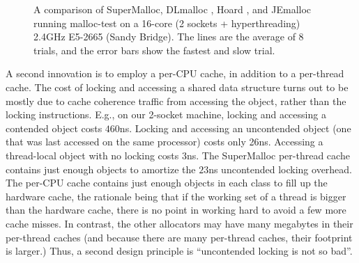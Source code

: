 \documentclass[pldi]{sigplanconf-pldi15}
\begin{document}
\begin{figure}

\caption{A comparison of SuperMalloc, DLmalloc \cite{Lea96}, Hoard
  \cite{BergerMcBl00}, and JEmalloc~\cite{Evans06} running malloc-test
  on a 16-core (2 sockets + hyperthreading) 2.4GHz E5-2665 (Sandy
  Bridge).  The lines are the average of 8 trials, and the error bars
  show the fastest and slow trial.}
\label{fig:data}
\vspace*{-3ex}
\end{figure}


A second innovation is to employ a per-CPU cache, in addition to a
per-thread cache.  The cost of locking and accessing a shared data
structure turns out to be mostly due to cache coherence traffic from
accessing the object, rather than the locking instructions.  E.g., on
our 2-socket machine, locking and accessing a contended object costs
$460$ns.  Locking and accessing an uncontended object (one that was
last accessed on the same processor) costs only 26ns.  Accessing a
thread-local object with no locking costs $3$ns.  The SuperMalloc
per-thread cache contains just enough objects to amortize the $23$ns
uncontended locking overhead.  The per-CPU cache contains just enough
objects in each class to fill up the hardware cache, the rationale
being that if the working set of a thread is bigger than the hardware
cache, there is no point in working hard to avoid a few more cache
misses.  In contrast, the other allocators may have many megabytes in
their per-thread caches (and because there are many per-thread caches,
their footprint is larger.)  Thus, a second design principle is
``uncontended locking is not so bad''.
\end{document}
